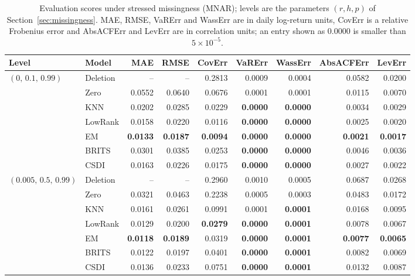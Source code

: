 \begin{table}[p]
  \centering
  \footnotesize
  \setlength{\tabcolsep}{4.5pt}
  \caption[Evaluation scores under stressed missingness]{Evaluation scores under stressed missingness (MNAR); levels are the parameters $(r, h, p)$ of Section~\ref{sec:missingness}. MAE, RMSE, VaRErr and WassErr are in daily log-return units, CovErr is a relative Frobenius error and AbsACFErr and LevErr are in correlation units; an entry shown as $0.0000$ is smaller than $5\times 10^{-5}$.}
  \label{tab:results_stressed}
  \begin{tabular}{llrrrrrrr}
    \toprule
    Level & Model & MAE & RMSE & CovErr & VaRErr & WassErr & AbsACFErr & LevErr \\
    \midrule
    $(0,\, 0.1,\, 0.99)$ & Deletion & -- & -- & 0.2813 & 0.0009 & 0.0004 & 0.0582 & 0.0200 \\
     & Zero & 0.0552 & 0.0640 & 0.0676 & 0.0001 & 0.0001 & 0.0115 & 0.0070 \\
     & KNN & 0.0202 & 0.0285 & 0.0229 & \textbf{0.0000} & \textbf{0.0000} & 0.0034 & 0.0029 \\
     & LowRank & 0.0158 & 0.0220 & 0.0116 & \textbf{0.0000} & \textbf{0.0000} & 0.0025 & 0.0020 \\
     & EM & \textbf{0.0133} & \textbf{0.0187} & \textbf{0.0094} & \textbf{0.0000} & \textbf{0.0000} & \textbf{0.0021} & \textbf{0.0017} \\
     & BRITS & 0.0301 & 0.0385 & 0.0253 & \textbf{0.0000} & \textbf{0.0000} & 0.0046 & 0.0036 \\
     & CSDI & 0.0163 & 0.0226 & 0.0175 & \textbf{0.0000} & \textbf{0.0000} & 0.0027 & 0.0022 \\
    \midrule
    $(0.005,\, 0.5,\, 0.99)$ & Deletion & -- & -- & 0.2960 & 0.0010 & 0.0005 & 0.0687 & 0.0268 \\
     & Zero & 0.0321 & 0.0463 & 0.2238 & 0.0005 & 0.0003 & 0.0483 & 0.0172 \\
     & KNN & 0.0161 & 0.0261 & 0.0991 & 0.0001 & \textbf{0.0001} & 0.0168 & 0.0095 \\
     & LowRank & 0.0129 & 0.0200 & \textbf{0.0279} & \textbf{0.0000} & \textbf{0.0001} & 0.0078 & 0.0067 \\
     & EM & \textbf{0.0118} & \textbf{0.0189} & 0.0319 & \textbf{0.0000} & \textbf{0.0001} & \textbf{0.0077} & \textbf{0.0065} \\
     & BRITS & 0.0122 & 0.0197 & 0.0401 & \textbf{0.0000} & \textbf{0.0001} & 0.0082 & 0.0069 \\
     & CSDI & 0.0136 & 0.0233 & 0.0751 & \textbf{0.0000} & \textbf{0.0001} & 0.0132 & 0.0087 \\

\end{tabular}
\end{table}
